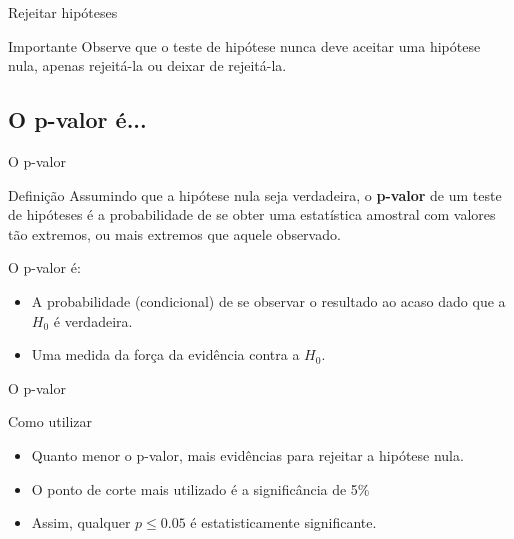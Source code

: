 \documentclass{beamer}
\begin{document}
\begin{frame}{\scriptsize Rejeitar hipóteses}
  \begin{block}{Importante}
    \footnotesize
    Observe que o teste de hipótese nunca deve \alert{aceitar} uma
    hipótese nula, apenas rejeitá-la ou deixar de rejeitá-la.
  \end{block}
\end{frame}

\subsection{O p-valor é...}

\begin{frame}{\scriptsize O p-valor}
  \begin{block}{Definição}
    \footnotesize
    Assumindo que a hipótese nula seja verdadeira, o {\bf p-valor} de
    um teste de hipóteses é a probabilidade de se obter uma
    estatística amostral com valores \alert{tão extremos, ou mais
      extremos} que aquele observado.
  \end{block}

  O p-valor \alert{é}:
  \begin{itemize}
    \footnotesize
  \item A probabilidade (condicional) de se observar o resultado ao
    acaso \alert{dado que} a $H_0$ é verdadeira.
  \item Uma medida da força da evidência \alert{contra} a $H_0$.
  \end{itemize}
\end{frame}

\begin{frame}{\scriptsize O p-valor}
  \begin{block}{Como utilizar}
    \footnotesize
    \begin{itemize}
    \item Quanto menor o p-valor, mais evidências para rejeitar a
      hipótese nula.
    \item O ponto de corte mais utilizado é a significância de 5\%
    \item Assim, qualquer $p \le 0.05$ é estatisticamente significante.
    \end{itemize}
  \end{block}
\end{frame}

\end{document}
